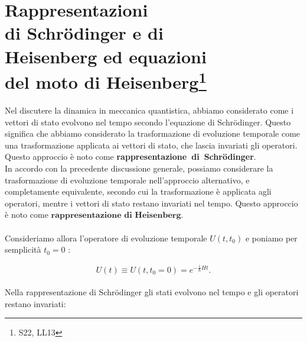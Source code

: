 \documentclass[a4paper,12pt,oneside]{book}
\newcommand*{\myfont}{\fontfamily{ppl}\selectfont}
\begin{document}
\fancypagestyle{plain}{%
\fancyhf{} %
\fancyfoot[C]{\bfseries \myfont{\thepage}} %
\renewcommand{\headrulewidth}{0pt}
\renewcommand{\footrulewidth}{0pt}}

\fancypagestyle{VS}{
\headheight = 15pt
\lhead[\myfont{\textit{\textbf{\thechapter\nouppercase{\leftmark}}}}]{\myfont{\textit{\textbf{\nouppercase{\leftmark}}}}}
\chead[]{}
\rhead[\myfont{\textbf{\thepage}}]{\myfont{\textbf{\thepage}}}

\lfoot[]{}
\cfoot[]{}
\rfoot[]{}
}



\pagestyle{VS}
\setcounter{chapter}{12}
\setcounter{page}{144}
\chapter[Rappresentazioni di Schrödinger e di Heisenberg]{Rappresentazioni\\ di Schrödinger e di\\ Heisenberg ed equazioni\\ del moto di Heisenberg\footnote{S22, LL13}}

Nel discutere la dinamica in meccanica quantistica, abbiamo considerato come i vettori di stato evolvono nel tempo secondo l'equazione di Schrödinger. Questo significa che abbiamo considerato la trasformazione di evoluzione temporale come una trasformazione applicata ai vettori di stato, che lascia invariati gli operatori. Questo approccio è noto come \textbf{rappresentazione~di~Schr\"{o}dinger}.\\
In accordo con la precedente discussione generale, possiamo considerare la trasformazione di evoluzione temporale nell'approccio alternativo, e completamente equivalente, secondo cui la trasformazione è applicata agli operatori, mentre i vettori di stato restano invariati nel tempo. Questo approccio è noto come $\textbf{rappresentazione~di~Heisenberg}$.\\
\\
\noindent Consideriamo allora l'operatore di evoluzione temporale $U(t, t_0)$ e poniamo per semplicità $t_0 = 0$ :
 
\begin{equation}
U(t) \equiv U(t,t_0 = 0) = e^{-\frac{i}{\hbar}Ht}.
\end{equation}
\\
\noindent Nella rappresentazione di Schrödinger gli stati evolvono nel tempo e gli operatori restano invariati:
\end{document}

